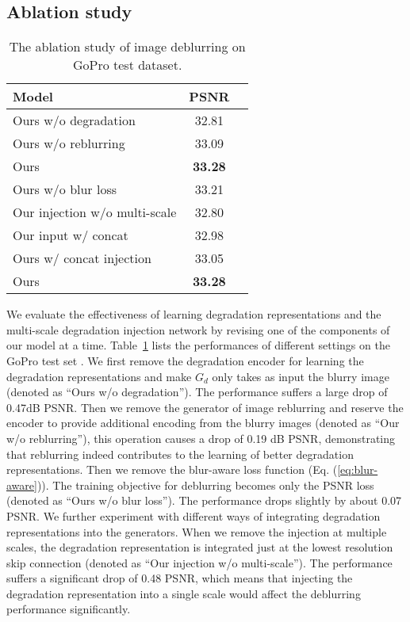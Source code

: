 \documentclass[runningheads]{llncs}
\begin{document}
\subsection{Ablation study}

\begin{table}[t]
\centering
		\begin{tabular}{l|cc}
			\hline
			Model & PSNR  \\  \hline 
			Ours w/o degradation & 32.81 \\
			Ours w/o reblurring & 33.09 \\ \hline
			Ours & \textbf{33.28}  \\\hline
			Ours w/o blur loss &  33.21 \\
			Our injection w/o multi-scale & 32.80 \\ 
			Our input w/ concat & 32.98 \\
			Ours w/ concat injection & 33.05  \\ \hline
			Ours & \textbf{33.28}  \\ \hline
		\end{tabular}
	\caption{The ablation study of image deblurring on GoPro test dataset\cite{deblur-multi-scale}.}
	\label{tb:ab_deblurring}
\end{table} We evaluate the effectiveness of learning degradation representations and the multi-scale degradation injection network by revising one of the components of our model at a time. Table~\ref{tb:ab_deblurring} lists the performances of different settings on the GoPro test set \cite{deblur-multi-scale}.
We first remove the degradation encoder for learning the degradation representations and make $G_d$ only takes as input the blurry image (denoted as ``Ours w/o degradation'').
The performance suffers a large drop of 0.47dB PSNR. Then we remove the generator of image reblurring and reserve the encoder to provide additional encoding from the blurry images (denoted as ``Our w/o reblurring''), this operation causes a drop of 0.19 dB PSNR, demonstrating that reblurring indeed contributes to the learning of better degradation representations.
Then we remove the blur-aware loss function (Eq. (\ref{eq:blur-aware})). The training objective for deblurring becomes only the PSNR loss (denoted as ``Ours w/o blur loss''). The performance drops slightly by about 0.07 PSNR.
We further experiment with different ways of integrating degradation representations into the generators. 
When we remove the injection at multiple scales, the degradation representation is integrated just at the lowest resolution skip connection (denoted as ``Our injection w/o multi-scale''). The performance suffers a significant drop of 0.48 PSNR, which means that injecting the degradation representation into a single scale would affect the deblurring performance significantly.
\end{document}

